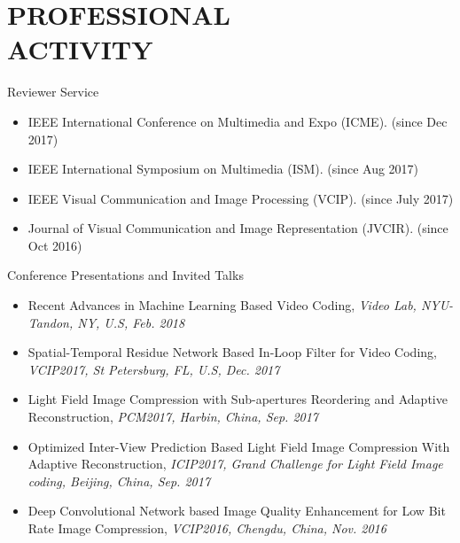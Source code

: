\documentclass[margin, 10pt]{res} %
\begin{document}
\begin{resume}
\begin{itemize}
\end{itemize}



\section{PROFESSIONAL \\ ACTIVITY}

Reviewer Service
\begin{itemize} \itemsep -2pt
\item{IEEE International Conference on Multimedia and Expo (ICME). (since Dec 2017)}
\item{IEEE International Symposium on Multimedia (ISM). (since Aug 2017)}
\item{IEEE Visual Communication and Image Processing (VCIP). (since July 2017)}
\item{Journal of Visual Communication and Image Representation (JVCIR). (since Oct  2016)}
\end{itemize}

Conference Presentations and Invited Talks
\begin{itemize} \itemsep -2pt
\item{Recent Advances in Machine Learning Based Video Coding, {\em Video Lab, NYU-Tandon, NY, U.S, Feb. 2018}}
\item{Spatial-Temporal Residue Network Based In-Loop Filter for Video Coding, {\em VCIP2017, St Petersburg, FL, U.S, Dec. 2017}}
\item{Light Field Image Compression with Sub-apertures Reordering and Adaptive Reconstruction, {\em PCM2017, Harbin, China, Sep. 2017}}
\item{Optimized Inter-View Prediction Based Light Field Image Compression With Adaptive Reconstruction, {\em ICIP2017, Grand Challenge for Light Field Image coding, Beijing, China, Sep. 2017}}
\item{Deep Convolutional Network based Image Quality Enhancement for Low Bit Rate Image Compression, {\em VCIP2016, Chengdu, China, Nov. 2016}}
\end{itemize}



\end{resume}
\end{document}
